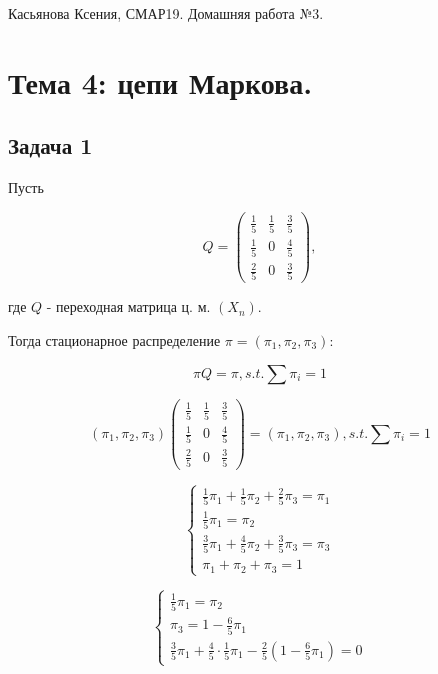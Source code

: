 \documentclass[a4paper,12pt]{article} %
\begin{document}
{ Касьянова Ксения, СМАР19. Домашняя работа №3. }

\noindent\makebox[\linewidth]{\rule{\textwidth}{0.4pt}}


\section*{Тема 4: цепи Маркова.}
\subsection*{Задача 1}

Пусть

$$Q=\left(\begin{matrix}
\frac{1}{5} & \frac{1}{5} & \frac{3}{5} \\
\frac{1}{5} & 0 & \frac{4}{5} \\
\frac{2}{5} & 0 & \frac{3}{5}
\end{matrix}\right),$$

где $Q$ - переходная матрица ц. м.  $(X_n)$. 

Тогда стационарное распределение $\pi=\left(\pi_{1}, \pi_{2}, \pi_{3}\right)$:

$$\pi Q=\pi, s.t. \sum \pi_i = 1 $$


$$\left(\pi_{1}, \pi_{2}, \pi_{3}\right)\left(\begin{array}{ccc}
\frac{1}{5} & \frac{1}{5} & \frac{3}{5} \\
\frac{1}{5} & 0 & \frac{4}{5} \\
\frac{2}{5} & 0 & \frac{3}{5}
\end{array}\right)=\left(\pi_{1}, \pi_{2}, \pi_{3}\right), s.t. \sum \pi_i = 1 $$


$$\left\{\begin{array}{l}
\frac{1}{5} \pi_{1}+\frac{1}{5} \pi_{2}+\frac{2}{5} \pi_{3}=\pi_{1} \\
\frac{1}{5} \pi_{1}=\pi_{2} \\
\frac{3}{5} \pi_{1}+\frac{4}{5} \pi_{2}+\frac{3}{5} \pi_{3}=\pi_{3}\\
\pi_{1}+\pi_{2}+\pi_{3}=1
\end{array}\right.$$

$$\left\{\begin{array}{l}
\frac{1}{5} \pi_{1}=\pi_{2} \\
\pi_{3}=1 - \frac{6}{5} \pi_{1}\\
\frac{3}{5} \pi_{1}+\frac{4}{5} \cdot \frac{1}{5} \pi_{1}-\frac{2}{5} (1 - \frac{6}{5} \pi_{1} )=0
\end{array}\right.$$
\end{document}

